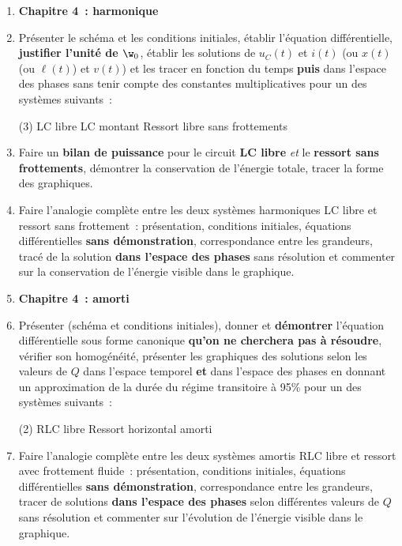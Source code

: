 \documentclass[a4paper, 12pt, final, garamond]{book}
\begin{document}
\begin{enumerate}
	\item[] \textbf{Chapitre 4~: harmonique}
	\item Présenter le schéma et les conditions initiales, établir l'équation
        différentielle, \textbf{justifier l'unité de $\w_0$}, établir les
        solutions de $u_C(t)$ et $i(t)$ (ou $x(t)$ (ou $\ell(t)$) et $v(t)$)
        et les tracer en fonction du temps \textbf{puis} dans l'espace des
        phases sans tenir compte des constantes multiplicatives pour un des
        systèmes suivants~:
	      \begin{tasks}[label=\protect\fbox{\Alph*}, label-width=4ex](3)
		      \task LC libre
		      \task LC montant
          \task Ressort libre sans frottements
	      \end{tasks}

  \item Faire un \textbf{bilan de puissance} pour le circuit \textbf{LC libre}
      \textit{et} le \textbf{ressort sans frottements}, démontrer la
      conservation de l'énergie totale, tracer la forme des graphiques.

  \item Faire l'analogie complète entre les deux systèmes harmoniques LC libre
      et ressort sans frottement~: présentation, conditions initiales,
      équations différentielles \textbf{sans démonstration}, correspondance
      entre les grandeurs, tracé de la solution \textbf{dans l'espace des
      phases} sans résolution et commenter sur la conservation de l'énergie
      visible dans le graphique.

  \item[] \textbf{Chapitre 4~: amorti}
  \item Présenter (schéma et conditions initiales),
        donner et \textbf{démontrer} l'équation différentielle sous
        forme canonique \textbf{qu'on ne cherchera pas à résoudre}, vérifier son
        homogénéité, présenter les graphiques des solutions selon les valeurs de
        $Q$ dans l'espace temporel \textbf{et} dans l'espace des phases en donnant
        un approximation de la durée du régime transitoire à 95\% pour un des
        systèmes suivants~:
	      \begin{tasks}[label=\protect\fbox{\Alph*}, label-width=4ex](2)
		      \task RLC libre
		      \task Ressort horizontal amorti
	      \end{tasks}

  \item Faire l'analogie complète entre les deux systèmes amortis RLC libre et
        ressort avec frottement fluide~: présentation, conditions initiales,
        équations différentielles \textbf{sans démonstration}, correspondance
        entre les grandeurs, tracer de solutions \textbf{dans l'espace des
        phases} selon différentes valeurs de $Q$ sans résolution et commenter
        sur l'évolution de l'énergie visible dans le graphique.


\end{enumerate}
\end{document}
